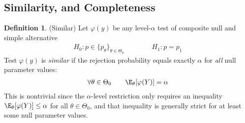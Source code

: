 \documentclass[12pt]{article}
\theoremstyle{plain}
\theoremstyle{definition}
\newtheorem{defn}[thm]{Definition}
\theoremstyle{remark}
\newcommand{\bstheta}{\boldsymbol{\theta}}
\newcommand{\bsTheta}{\boldsymbol{\Theta}}
\newcommand{\bstildetheta}{\boldsymbol{\tilde{\theta}}}
\DeclareMathOperator*{\argmax}{arg\;max}
\begin{document}

\clearpage
\subsection{Similarity, and Completeness}

\begin{defn}(Similar)
Let $\varphi(y)$ be any level-$\alpha$ test of composite null and simple
alternative
\begin{align}
  H_0: p\in \{p_\theta\}_{\theta\in\Theta_0}
  \qquad
  \qquad
  H_1: p=p_1
  \label{similar}
\end{align}
Test $\varphi(y)$ is \emph{similar} if the rejection probability equals
exactly $\alpha$ for \emph{all} null parameter values:
\begin{align*}
  \forall \theta\in\Theta_0
  \qquad
  \E_{\theta}[\varphi(Y)]
  = \alpha
\end{align*}
This is nontrivial since the $\alpha$-level restriction only requires an
inequality $\E_{\theta}[\varphi(Y)] \leq \alpha$ for all
$\theta\in\Theta_0$, and that inequality is generally strict for at
least some null parameter values.
\end{defn}
\end{document}
